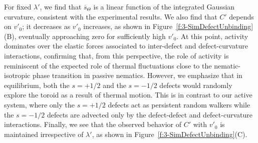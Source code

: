 For fixed $\lambda'$, we find that $\overbar{s}_{\Theta}$ is a linear function of the integrated Gaussian curvature, consistent with the experimental results.
We also find that $C'$ depends on $v'_0$; it decreases as $v'_0$ increases, as shown in Figure~\ref{f:3-SimDefectUnbinding}(B), eventually approaching zero for sufficiently high $v'_0$.
At this point, activity dominates over the elastic forces associated to inter-defect and defect-curvature interactions, confirming that, from this perspective, the role of activity is reminiscent of the expected role of thermal fluctuations close to the nematic-isotropic phase transition in passive nematics.
However, we emphasize that in equilibrium, both the $s = +1/2$ and the $s = -1/2$ defects would randomly explore the toroid as a result of thermal motion.
This is in contrast to our active system, where only the $s = +1/2$ defects act as persistent random walkers while the $s = -1/2$ defects are advected only by the defect-defect and defect-curvature interactions.
Finally, we see that the observed behavior of $C'$ with $v'_0$ is maintained irrespective of $\lambda'$, as shown in Figure~\ref{f:3-SimDefectUnbinding}(C).


